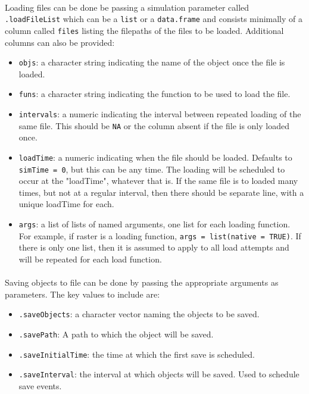 \documentclass{article}
\begin{document}
\paragraph{}
Loading files can be done be passing a simulation parameter called \texttt{.loadFileList} which can be a \texttt{list} or a \texttt{data.frame} and consists minimally of a column called \texttt{files} listing the filepaths of the files to be loaded. Additional columns can also be provided:

\begin{itemize}
  \item \texttt{objs}: a character string indicating the name of the object once the file is loaded.
  \item \texttt{funs}: a character string indicating the function to be used to load the file.
  \item \texttt{intervals}: a numeric indicating the interval between repeated loading of the same file. This should be \texttt{NA} or the column absent if the file is only loaded once.
  \item \texttt{loadTime}: a numeric indicating when the file should be loaded. Defaults to \texttt{simTime = 0}, but this can be any time. The loading will be scheduled to occur at the "loadTime", whatever that is. If the same file is to loaded many times, but not at a regular interval, then there should be separate line, with a unique loadTime for each.
  \item \texttt{args}: a list of lists of named arguments, one list for each loading function. For example, if raster is a loading function, \texttt{args = list(native = TRUE)}. If there is only one list, then it is assumed to apply to all load attempts and will be repeated for each load function.
\end{itemize}

\paragraph{}
Saving objects to file can be done by passing the appropriate arguments as parameters. The key values to include are:

\begin{itemize}
  \item \texttt{.saveObjects}: a character vector naming the objects to be saved.
  \item \texttt{.savePath}: A path to which the object will be saved.
  \item \texttt{.saveInitialTime}: the time at which the first save is scheduled.
  \item \texttt{.saveInterval}: the interval at which objects will be saved. Used to schedule save events.
\end{itemize}
\end{document}
